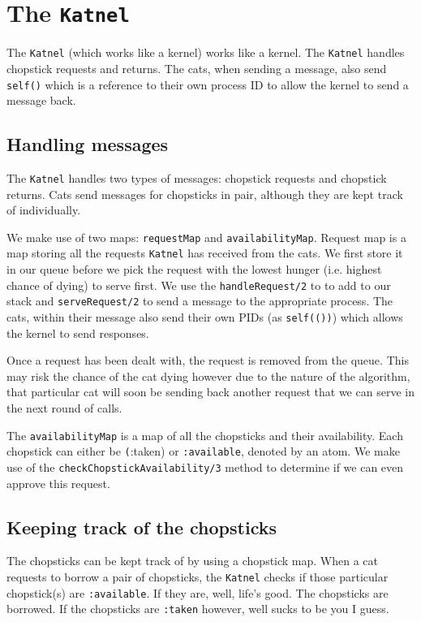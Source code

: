 \section{The \texttt{Katnel}}
The \texttt{Katnel} (which works like a kernel) works like a kernel. The \texttt{Katnel} handles chopstick requests and returns. The cats, when sending a message, also send \texttt{self()} which is a reference to their own process ID to allow the kernel to send a message back.

\subsection{Handling messages}
The \texttt{Katnel} handles two types of messages: chopstick requests and chopstick returns. Cats send messages for chopsticks in pair, although they are kept track of individually.

We make use of two maps: \texttt{requestMap} and \texttt{availabilityMap}. Request map is a map storing all the requests \texttt{Katnel} has received from the cats. We first store it in our queue before we pick the request with the lowest hunger (i.e. highest chance of dying) to serve first. We use the \texttt{handleRequest/2} to to add to our stack and \texttt{serveRequest/2} to send a message to the appropriate process. The cats, within their message also send their own PIDs (as \texttt{self(())}) which allows the kernel to send responses. 

Once a request has been dealt with, the request is removed from the queue. This may risk the chance of the cat dying however due to the nature of the algorithm, that particular cat will soon be sending back another request that we can serve in the next round of calls.

The \texttt{availabilityMap} is a map of all the chopsticks and their availability. Each chopstick can either be \texttt(:taken) or \texttt{:available}, denoted by an atom. We make use of the \texttt{checkChopstickAvailability/3} method to determine if we can even approve this request.




\subsection{Keeping track of the chopsticks}
The chopsticks can be kept track of by using a chopstick map. When a cat requests to borrow a pair of chopsticks, the \texttt{Katnel} checks if those particular chopstick(s) are \texttt{:available}. If they are, well, life's good. The chopsticks are borrowed. If the chopsticks are \texttt{:taken} however, well sucks to be you I guess.

